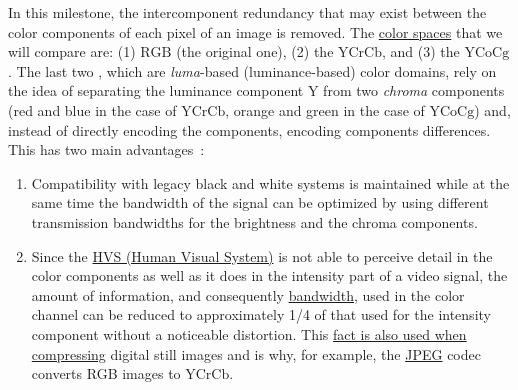 In this milestone, the intercomponent redundancy that may exist
between the color components of each pixel of an image is removed. The
\href{https://en.wikipedia.org/wiki/Color_space}{color spaces} that we
will compare are: (1)
\href{https://en.wikipedia.org/wiki/RGB_color_model}{$\text{RGB}$}
(the original one), (2) the
\href{https://en.wikipedia.org/wiki/YCbCr}{$\text{YCrCb}$}, and (3)
the \href{https://en.wikipedia.org/wiki/YCoCg}{$\text{YCoCg}$}. The
last two , which are \emph{luma}-based (luminance-based) color
domains, rely on the idea of separating the luminance component Y from
two \emph{chroma} components (red and blue in the case of
$\text{YCrCb}$, orange and green in the case of $\text{YCoCg}$) and,
instead of directly encoding the components, encoding components
diﬀerences. This has two main advantages~\cite{burger2016digital}:
\begin{enumerate}
\item Compatibility with legacy black and white systems is maintained
  while at the same time the bandwidth of the signal can be optimized
  by using diﬀerent transmission bandwidths for the brightness and the
  chroma components.
\item Since the \href{https://en.wikipedia.org/wiki/Visual_system}{HVS
  (Human Visual System)} is not able to perceive detail in the color
  components as well as it does in the intensity part of a video
  signal, the amount of information, and
  consequently \href{https://en.wikipedia.org/wiki/Bandwidth_(signal_processing)}{bandwidth},
  used in the color channel can be reduced to approximately 1/4 of
  that used for the intensity component without a noticeable
  distortion. This \href{https://en.wikipedia.org/wiki/Bandwidth_(computing)}{fact
  is also used when compressing} digital still images and is why, for
  example, the \href{https://en.wikipedia.org/wiki/JPEG}{JPEG} codec
  converts RGB images to $\text{YCrCb}$.
\end{enumerate}


